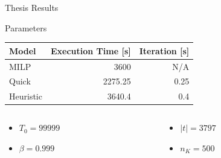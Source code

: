 \documentclass[aspectratio=169,dvipsnames]{beamer}
\begin{document}
\begin{frame}[label={sec:org1193f87}]{}
\centering
\Huge Thesis Results
\end{frame}

\begin{frame}[label={sec:org441b7dd}]{Parameters}
\begin{center}
\begin{tabular}{lrr}
\alert{Model} & \alert{Execution Time} [s] & \alert{Iteration} [s]\\[0pt]
\hline
MILP & 3600 & N/A\\[0pt]
Quick & 2275.25 & 0.25\\[0pt]
Heuristic & 3640.4 & 0.4\\[0pt]
\end{tabular}
\end{center}

\begin{columns}
\begin{column}{0.5\columnwidth}
\begin{itemize}
\item \(T_0 = 99999\)
\item \(\beta = 0.999\)
\end{itemize}
\end{column}
\begin{column}{0.5\columnwidth}
\begin{itemize}
\item \(|t| = 3797\)
\item \(n_K = 500\)
\end{itemize}
\end{column}
\end{columns}
\end{frame}
\end{document}
